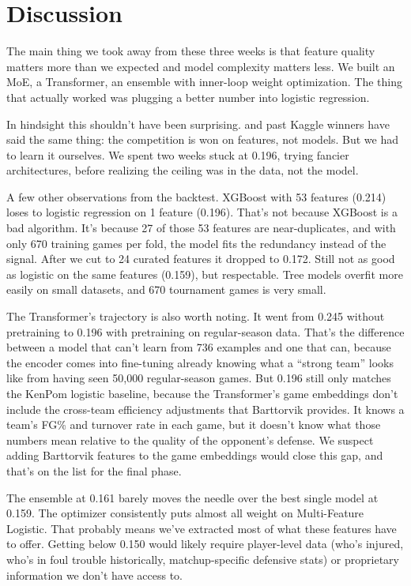 \documentclass[11pt,a4paper]{article}
\begin{document}
\section{Discussion}

The main thing we took away from these three weeks is that feature quality matters more than we expected and model complexity matters less. We built an MoE, a Transformer, an ensemble with inner-loop weight optimization. The thing that actually worked was plugging a better number into logistic regression.

In hindsight this shouldn't have been surprising. \citet{pomeroy2004} and past Kaggle winners have said the same thing: the competition is won on features, not models. But we had to learn it ourselves. We spent two weeks stuck at 0.196, trying fancier architectures, before realizing the ceiling was in the data, not the model.

A few other observations from the backtest. XGBoost with 53 features (0.214) loses to logistic regression on 1 feature (0.196). That's not because XGBoost is a bad algorithm. It's because 27 of those 53 features are near-duplicates, and with only 670 training games per fold, the model fits the redundancy instead of the signal. After we cut to 24 curated features it dropped to 0.172. Still not as good as logistic on the same features (0.159), but respectable. Tree models overfit more easily on small datasets, and 670 tournament games is very small.

The Transformer's trajectory is also worth noting. It went from 0.245 without pretraining to 0.196 with pretraining on regular-season data. That's the difference between a model that can't learn from 736 examples and one that can, because the encoder comes into fine-tuning already knowing what a ``strong team'' looks like from having seen 50,000 regular-season games. But 0.196 still only matches the KenPom logistic baseline, because the Transformer's game embeddings don't include the cross-team efficiency adjustments that Barttorvik provides. It knows a team's FG\% and turnover rate in each game, but it doesn't know what those numbers mean relative to the quality of the opponent's defense. We suspect adding Barttorvik features to the game embeddings would close this gap, and that's on the list for the final phase.

The ensemble at 0.161 barely moves the needle over the best single model at 0.159. The optimizer consistently puts almost all weight on Multi-Feature Logistic. That probably means we've extracted most of what these features have to offer. Getting below 0.150 would likely require player-level data (who's injured, who's in foul trouble historically, matchup-specific defensive stats) or proprietary information we don't have access to.
\end{document}
